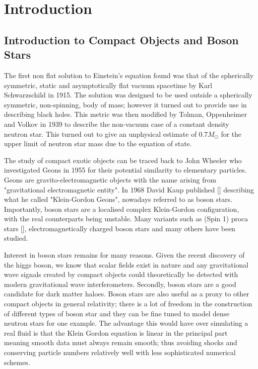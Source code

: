 


\section{Introduction}
\subsection{Introduction to Compact Objects and Boson Stars}
The first non flat solution to Einstein's equation found was that of the spherically symmetric, static and asymptotically flat vacuum spacetime by Karl Schwarzschild in 1915. The solution was designed to be used outside a spherically symmetric, non-spinning, body of mass; however it turned out to provide use in describing black holes. This metric was then modified by Tolman, Oppenheimer and Volkov in 1939 to describe the non-vacuum case of a constant density neutron star. This turned out to give an unphysical estimate of $0.7 M_\odot$ for the upper limit of neutron star mass due to the equation of state. 

The study of compact exotic objects can be traced back to John Wheeler who investigated Geons in 1955 for their potential similarity to elementary particles. Geons are gravito-electromagnetic objects with the name arising from "gravitational electromagnetic entity". In 1968 David Kaup published [] describing what he called "Klein-Gordon Geons", nowadays referred to as boson stars. Importantly, boson stars are a localised complex Klein-Gordon configuration, with the real counterparts being unstable. Many variants such as (Spin 1) proca stars [], electromagnetically charged boson stars and many others have been studied. 

Interest in boson stars remains for many reasons. Given the recent discovery of the higgs boson, we know that scalar fields exist in nature and any gravitational wave signals created by compact objects could theoretically be detected with modern gravitational wave interferometers. Secondly, boson stars are a good candidate for dark matter haloes. Boson stars are also useful as a proxy to other compact objects in general relativity; there is a lot of freedom in the construction of different types of boson star and they can be fine tuned to model dense neutron stars for one example. The advantage this would have over simulating a real fluid is that the Klein Gordon equation is linear in the principal part meaning smooth data must always remain smooth; thus avoiding shocks and conserving particle numbers relatively well with less sophisticated numerical schemes. 

